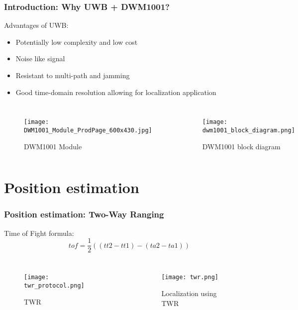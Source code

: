 \documentclass[10pt]{beamer}
\begin{document}
\begin{frame}
    \frametitle{Introduction: Why UWB + DWM1001?}
    Advantages of UWB:
    \begin{itemize}
        \item Potentially low complexity and low cost
        \item Noise like signal
        \item Resistant to multi-path and jamming
        \item Good time-domain resolution allowing for localization application
    \end{itemize}
    \begin{columns}
        \begin{figure}[H]
            \centering
            \texttt{[image: DWM1001\_Module\_ProdPage\_600x430.jpg]}
            \caption{DWM1001 Module}
            \label{fig:DWM1001_Module_ProdPage_600x430}
        \end{figure}
        \begin{figure}[H]
            \centering
            \texttt{[image: dwm1001\_block\_diagram.png]}
            \caption{DWM1001 block diagram}
            \label{fig:dwm1001_block_diagram}
        \end{figure}
    \end{columns}
\end{frame}

\section{Position estimation}

\begin{frame}
    \frametitle{Position estimation: Two-Way Ranging}
    Time of Fight formula: 
    \begin{equation}
        tof = \frac{1}{2} ((tt2 - tt1) - (ta2 - ta1))
        \label{eqn:pos_est_twr_tof}
    \end{equation}
    \begin{columns}
        \begin{figure}[H]
            \centering
            \texttt{[image: twr\_protocol.png]}
            \caption{TWR}
            \label{fig:twr_anchor_and_tag}
        \end{figure}
        \begin{figure}[H]
            \centering
            \texttt{[image: twr.png]}
            \caption{Localization using TWR}
            \label{fig:twr_trilateration}
        \end{figure}
    \end{columns}
\end{frame}
\end{document}
